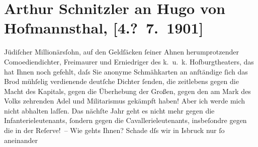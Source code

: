 

         
         \newcommand{\erwaehntePersonen}{Personen: Richard Beer-Hofmann, Hugo von Hofmannsthal, Gertrude von Hofmannsthal, Olga Schnitzler, Elisabeth Steinrück}
         \newcommand{\erwaehnteInstitutionen}{Institutionen: Burgtheater}
         \newcommand{\erwaehnteOrte}{Orte: Innsbruck, Salzburg, St. Anton am Arlberg, Wien}
         \newcommand{\erwaehnteWerke}{Werke: Lieutenant Gustl. Novelle}
               \section[Arthur Schnitzler an Hugo von Hofmannsthal, {[}4.? 7. 1901{]}]{ Arthur Schnitzler an Hugo von Hofmannsthal, {[}4.? 7. 1901{]}}\nopagebreak{}\rehead{ }\begin{ledgroupsized}[t]{13cm}\normalsize\beginnumbering \toendnotes[C]{\smallbreak\pagebreak[2]} 
\toendnotes[C]{\smallbreak}\pstart
           \noindent{}{\pb}Jüdiſcher Millionärsſohn, auf den Geldſäcken ſeiner Ahnen
               herumprotzender Comoediendichter, Freimaurer und Erniedriger des k. u. k. Hofburgtheaters, das hat Ihnen noch gefehlt, daſs Sie
               anonyme Schmähkarten an anſtändige ſich das Brod mühſelig verdienende deutſche
               Dichter ſenden, die zeitlebens gegen die Macht des Kapitals, gegen die Über{\pb}hebung der Großen, gegen den am Mark des Volks zehrenden
               Adel und Militarismus gekämpft haben! Aber ich werde mich nicht abhalten laſſen. Das
               nächſte Jahr geht es nicht mehr gegen die Infanterieleutenants, ſondern gegen die
               Cavallerieleutenants, insbeſondre gegen die in der Reſerve! –\pend
           \pstart
           Wie gehts Ihnen? Schade dſs {\pb}wir in I{\geminationn}sbruck nur ſo aneinander

\end{ledgroupsized}
